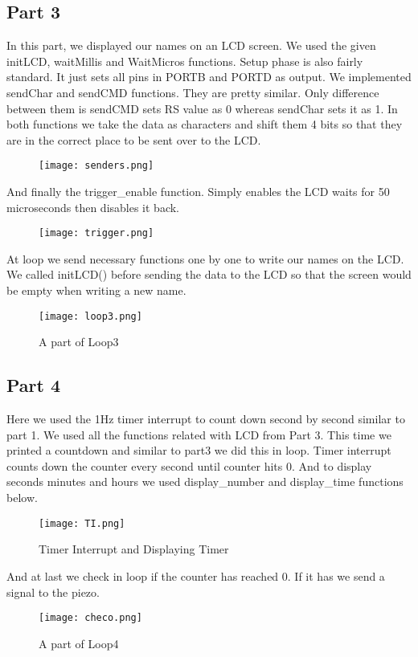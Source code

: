 \documentclass[pdftex,12pt,a4paper]{article}
\begin{document}
\subsection{Part 3}
In this part, we displayed our names on an LCD screen. We used the given initLCD, waitMillis and WaitMicros functions. Setup phase is also fairly standard. It just sets all pins in PORTB and PORTD as output. We implemented sendChar and sendCMD functions. They are pretty similar. Only difference between them is sendCMD sets RS value as 0 whereas sendChar sets it as 1. In both functions we take the data as characters and shift them 4 bits so that they are in the correct place to be sent over to the LCD.
\begin{figure}[H]
	\centering
	\texttt{[image: senders.png]}
\end{figure}
And finally the trigger\_enable function. Simply enables the LCD waits for 50 microseconds then disables it back. 
\begin{figure}[H]
	\centering
	\texttt{[image: trigger.png]}
\end{figure}
At loop we send necessary functions one by one to write our names on the LCD. We called initLCD() before sending the data to the LCD so that the screen would be empty when writing a new name.
\begin{figure}[H]
	\centering
	\texttt{[image: loop3.png]}
	\caption{A part of Loop3}
\end{figure}

\subsection{Part 4}
Here we used the 1Hz timer interrupt to count down second by second similar to part 1. We used all the functions related with LCD from Part 3. This time we printed a countdown and similar to part3 we did this in loop. Timer interrupt counts down the counter every second until counter hits 0. And to display seconds minutes and hours we used display\_number and display\_time functions below.
\newline
\begin{figure}[H]
	\centering
	\texttt{[image: TI.png]}
	\caption{Timer Interrupt and Displaying Timer}
\end{figure}
And at last we check in loop if the counter has reached 0. If it has we send a signal to the piezo.
\begin{figure}[H]
	\centering
	\texttt{[image: checo.png]}
	\caption{A part of Loop4}
\end{figure}
\end{document}

